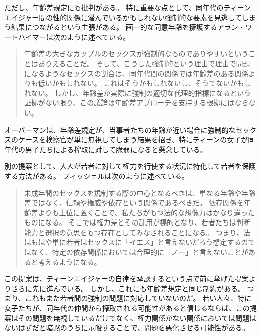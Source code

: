 \documentclass[paper=a4,book,openany]{jlreq}
\begin{document}
ただし、年齢差規定にも批判がある。
特に重要な点として、同年代のティーンエイジャー間の性的関係に潜んでいるかもしれない強制的な要素を見逃してしまう結果につながるという主張がある。
画一的な同意年齢を擁護するアラン・ワートハイマーは次のように述べている。

\begin{quote}
年齢差の大きなカップルのセックスが強制的なものでありやすいということはありえることだ。
そして、こうした強制的という理由で理由で問題になるようなセックスの割合は、同年代間の関係では年齢差のある関係よりも低いかもしれない。
これはそうかもしれないし、そうでないかもしれない。
しかし、年齢差が実際に強制の適切な代理的指標になるという証拠がない限り、この議論は年齢差アプローチを支持する根拠にはならない。
\citep[p.218]{wertheimer03:_consen_sexual_relat}
\end{quote}

オーバーマンは、年齢差規定が、当事者たちの年齢が近い場合に強制的なセックスのケースを検察官が単に無視してしまう結果を招き、特にティーンの女子が同年代の男子たちによる搾取に対して脆弱になると懸念している\citep[p.751]{oberman01:_girls_master_house}。

別の提案として、大人が若者に対して権力を行使する状況に特化して若者を保護する方法がある。
フィッシェルは次のように述べている。

\begin{quote}
未成年間のセックスを規制する際の中心となるべきは、単なる年齢や年齢差ではなく、信頼や権威や依存という関係であるべきだ。
依存関係を年齢差よりも上位に置くことで、私たちがもつ法的な想像力はかなり違ったものになる。
そこでは権力差とその乱用が標的となり、若者たちは判断能力と選択の意思をもつ存在としてみなされることになる。
つまり、法はもはや単に若者はセックスに「イエス」と言えないだろう想定するのではなく、特定の依存関係においては合理的に「ノー」と言えないことがあると考えるようになる。
\citep[pp.315--316]{fischel10:_per_se_power}
\end{quote}

この提案は、ティーンエイジャーの自律を承認するという点で前に挙げた提案よりさらに先に進んでいる。
しかし、これにも年齢差規定と同じ制約がある。
つまり、これもまた若者間の強制の問題に対応していないのだ。
若い人々、特に女子たちが、同年代の仲間から搾取される可能性があると信じるならば、この提案はその問題を無視しているだけでなく、権力関係がない関係においては問題はないはずだと暗黙のうちに示唆することで、問題を悪化させる可能性がある。
\end{document}
